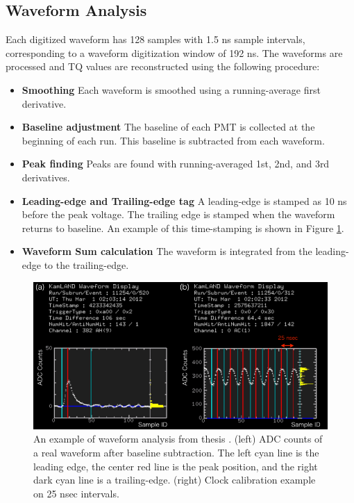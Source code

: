 \subsection{Waveform Analysis}
Each digitized waveform has 128 samples with 1.5 ns sample intervals, corresponding to a waveform digitization window of 192 ns. The waveforms are processed and TQ values are reconstructed using the following procedure:
\begin{itemize}
	\item \textbf{Smoothing} Each waveform is smoothed using a running-average first derivative.
	\item \textbf{Baseline adjustment} The baseline of each PMT is collected at the beginning of each run. This baseline is subtracted from each waveform.
	\item \textbf{Peak finding} Peaks are found with running-averaged 1st, 2nd, and 3rd derivatives.
	\item \textbf{Leading-edge and Trailing-edge tag} A leading-edge is stamped as 10 ns before the peak voltage. The trailing edge is stamped when the waveform returns to baseline. An example of this time-stamping is shown in Figure \ref{fig:waveform_analysis}.
	\item \textbf{Waveform Sum calculation} The waveform is integrated from the leading-edge to the trailing-edge.
\end{itemize}

\begin{figure}[htb]
	\centering
	\includegraphics[scale=0.5]{waveform_analysis.png}
	\caption{An example of waveform analysis from thesis \cite{yoshida_phd}. (left) ADC counts of a real waveform after baseline subtraction. The left cyan line is the leading edge, the center red line is the peak position, and the right dark cyan line is a trailing-edge. (right) Clock calibration example on 25 nsec intervals.}
	\label{fig:waveform_analysis}
\end{figure}

